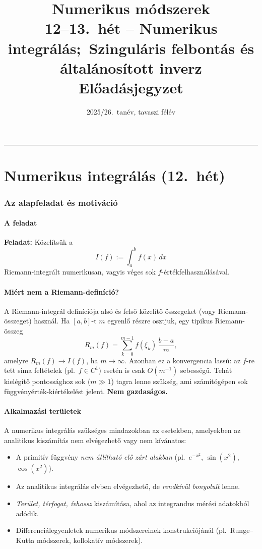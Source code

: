 \documentclass[a4paper,12pt]{article}
\title{\LARGE\bfseries Numerikus módszerek\\[6pt]
  \large 12--13.\ hét -- Numerikus integrálás;\
  Szinguláris felbontás és általánosított inverz\\[4pt]
  \normalsize Előadásjegyzet}
\date{2025/26.\ tanév, tavaszi félév}
\theoremstyle{mydef}
\begin{document}
\maketitle
\vspace{-1em}
\hrule
\vspace{0.5em}
\tableofcontents
\newpage

\part{Numerikus integrálás (12.\ hét)}

\section{Az alapfeladat és motiváció}

\subsection*{A feladat}

\textbf{Feladat:} Közelítsük a
\[
  I(f) := \int_a^b f(x)\,dx
\]
Riemann-integrált numerikusan, vagyis véges sok $f$-értékfelhasználásával.

\subsection*{Miért nem a Riemann-definíció?}

A Riemann-integrál definíciója alsó és felső közelítő összegeket (vagy Riemann-összeget) használ.
Ha $[a,b]$-t $m$ egyenlő részre osztjuk, egy tipikus Riemann-összeg
\[
  R_m(f) = \sum_{k=0}^{m-1} f(\xi_k)\,\frac{b-a}{m},
\]
amelyre $R_m(f)\to I(f)$, ha $m\to\infty$. Azonban ez a konvergencia lassú:
az $f$-re tett sima feltételek (pl.\ $f\in C^1$) esetén is csak $O(m^{-1})$
sebességű. Tehát kielégítő pontossághoz sok ($m\gg 1$) tagra lenne szükség,
ami számítógépen sok függvényérték-kiértékelést jelent. \textbf{Nem gazdaságos.}

\subsection*{Alkalmazási területek}

A numerikus integrálás szükséges mindazokban az esetekben, amelyekben az analitikus
kiszámítás nem elvégezhető vagy nem kívánatos:
\begin{itemize}[noitemsep,topsep=2pt]
  \item A primitív függvény \emph{nem állítható elő zárt alakban} (pl.\ $e^{-x^2}$,
        $\sin(x^2)$, $\cos(x^2)$).
  \item Az analitikus integrálás elvben elvégezhető, de \emph{rendkívül bonyolult}
        lenne.
  \item \emph{Terület, térfogat, ívhossz} kiszámítása, ahol az integrandus mérési
        adatokból adódik.
  \item Differenciálegyenletek numerikus módszereinek konstrukciójánál (pl.\ Runge--Kutta
        módszerek, kollokatív módszerek).
\end{itemize}
\end{document}
